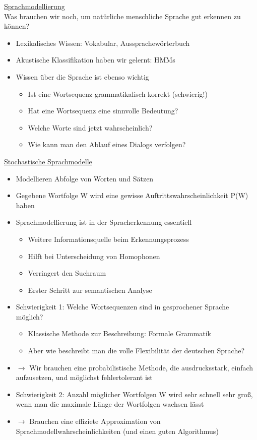 \documentclass[a4paper,10pt,oneside]{article}
\begin{document}
\underline{Sprachmodellierung} \\
Was brauchen wir noch, um natürliche menschliche Sprache gut erkennen zu können?
	\begin{itemize}
		\item Lexikalisches Wissen: Vokabular, Aussprachewörterbuch
		\item Akustische Klassifikation haben wir gelernt: HMMs
		\item Wissen über die Sprache ist ebenso wichtig
			\begin{itemize}
				\item Ist eine Wortsequenz grammatikalisch korrekt (schwierig!)
				\item Hat eine Wortsequenz eine sinnvolle Bedeutung?
				\item Welche Worte sind jetzt wahrscheinlich?
				\item Wie kann man den Ablauf eines Dialogs verfolgen?
			\end{itemize}			 
	\end{itemize}
	
\underline{Stochastische Sprachmodelle} \\
	\begin{itemize}
		\item Modellieren Abfolge von Worten und Sätzen
		\item Gegebene Wortfolge W wird eine gewisse Auftrittswahrscheinlichkeit P(W) haben
		\item Sprachmodellierung ist in der Spracherkennung essentiell
			\begin{itemize}
				\item Weitere Informationsquelle beim Erkennungsprozess
				\item Hilft bei Unterscheidung von Homophonen
				\item Verringert den Suchraum 
				\item Erster Schritt zur semantischen Analyse
			\end{itemize}
		\item Schwierigkeit 1: Welche Wortsequenzen sind in gesprochener Sprache möglich?
			\begin{itemize}
				\item Klassische Methode zur Beschreibung: Formale Grammatik
				\item Aber wie beschreibt man die volle Flexibilität der deutschen Sprache?
			\end{itemize}
		\item[] $\rightarrow$ Wir brauchen eine probabilistische Methode, die ausdrucksstark, einfach aufzusetzen, und möglichst fehlertolerant ist
		\item Schwierigkeit 2: Anzahl möglicher Wortfolgen W wird sehr schnell sehr groß, wenn man die maximale Länge der Wortfolgen wachsen lässt
		\item $\rightarrow$ Brauchen eine effiziete Approximation von Sprachmodellwahrscheinlichkeiten (und einen guten Algorithmus)
	\end{itemize}
	
\end{document}
